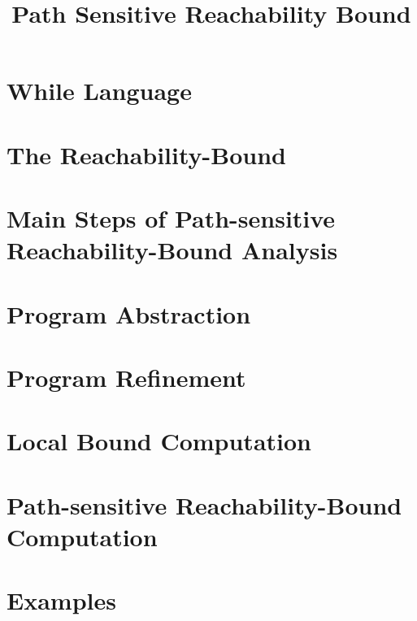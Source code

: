 \documentclass[a4paper,11pt]{article}
\begin{document}
\title{Path Sensitive Reachability Bound}

\author{}

\date{}

\maketitle
%
\tableofcontents

% 
\section{{While Language}}
\label{sec:language}

\section{{The Reachability-Bound}}
\label{sec:execution_rb}

\section{Main Steps of Path-sensitive Reachability-Bound Analysis}
\label{sec:static_rb}

\section{Program Abstraction}
\label{sec:progabs}

\section{Program Refinement}
\label{sec:refine}

\section{Local Bound Computation}
\label{sec:outinalg}

\section{Path-sensitive Reachability-Bound Computation}
\label{sec:inoutalg}

% 

\section{Examples}
\label{sec:example}






% 
\end{document}
